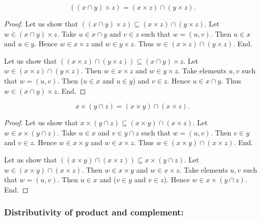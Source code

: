 \documentclass[../../set-theory.ftl.tex]{subfiles}
\begin{document}
  \begin{forthel}
    \begin{proposition}\label{SetTheory_01_06_811990}
      \[ ((x \cap y) \times z) = (x \times z) \cap (y \times z). \]
    \end{proposition}
    \begin{proof}
      Let us show that $((x \cap y) \times z) \subseteq (x \times z) \cap (y \times z).$
        Let $w \in (x \cap y) \times z$.
        Take $u \in x \cap y$ and $v \in z$ such that $w = (u,v)$.
        Then $u \in x$ and $u \in y$.
        Hence $w \in x \times z$ and $w \in y \times z$.
        Thus $w \in (x \times z) \cap (y \times z)$.
      End.

      Let us show that $((x \times z) \cap (y \times z)) \subseteq (x \cap y) \times z$.
        Let $w \in (x \times z) \cap (y \times z)$.
        Then $w \in x \times z$ and $w \in y \times z$.
        Take elements $u,v$ such that $w = (u,v)$.
        Then ($u \in x$ and $u \in y$) and $v \in z$.
        Hence $u \in x \cap y$.
        Thus $w \in (x \cap y) \times z$.
      End.
    \end{proof}

    \begin{proposition}\label{SetTheory_01_06_427022}
      \[ x \times (y \cap z) = (x \times y) \cap (x \times z). \]
    \end{proposition}
    \begin{proof}
      Let us show that $x \times (y \cap z) \subseteq (x \times y) \cap (x \times z)$.
        Let $w \in x \times (y \cap z)$.
        Take $u \in x$ and $v \in y \cap z$ such that $w = (u,v)$.
        Then $v \in y$ and $v \in z$.
        Hence $w \in x \times y$ and $w \in x \times z$.
        Thus $w \in (x \times y) \cap (x \times z)$.
      End.

      Let us show that $((x \times y) \cap (x \times z)) \subseteq x \times (y \cap z)$.
        Let $w \in (x \times y) \cap (x \times z)$.
        Then $w \in x \times y$ and $w \in x \times z$.
        Take elements $u,v$ such that $w = (u,v)$.
        Then $u \in x$ and ($v \in y$ and $v \in z$).
        Hence $w \in x \times (y \cap z)$.
      End.
    \end{proof}
  \end{forthel}


  \subsubsection*{Distributivity of product and complement:}
\end{document}
